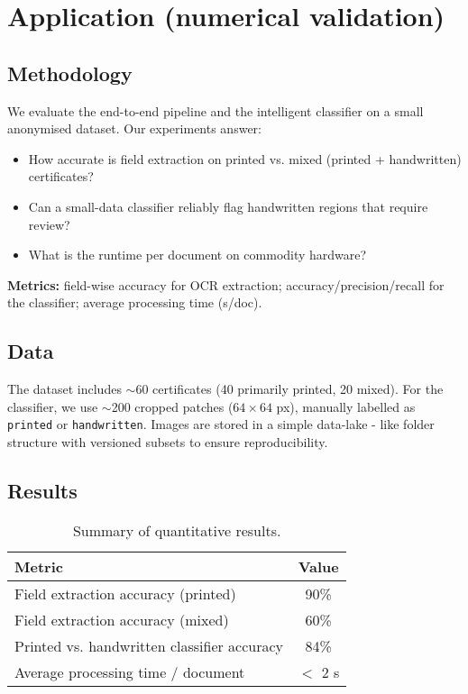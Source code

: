 \documentclass[runningheads,a4paper,11pt]{report}
\begin{document}
\chapter{Application (numerical validation)}
\label{chapter:application}

\section{Methodology}
We evaluate the end-to-end pipeline and the intelligent classifier on a small anonymised dataset.
Our experiments answer:
\begin{itemize}
  \item How accurate is field extraction on printed vs. mixed (printed + handwritten) certificates?
  \item Can a small-data classifier reliably flag handwritten regions that require review?
  \item What is the runtime per document on commodity hardware?
\end{itemize}
\noindent
\textbf{Metrics:} field-wise accuracy for OCR extraction; accuracy/precision/recall for the classifier; average processing time (s/doc).

\section{Data}
The dataset includes $\sim$60 certificates (40 primarily printed, 20 mixed).
For the classifier, we use $\sim$200 cropped patches ($64\times 64$ px), manually labelled as \texttt{printed} or \texttt{handwritten}.
Images are stored in a simple data-lake - like folder structure with versioned subsets to ensure reproducibility.

\section{Results}
\begin{table}[htbp]
\centering
\caption{Summary of quantitative results.}
\begin{tabular}{l c}
\hline
Metric & Value \\
\hline
Field extraction accuracy (printed) & 90\% \\
Field extraction accuracy (mixed) & 60\% \\
Printed vs. handwritten classifier accuracy & 84\% \\
Average processing time / document & $<$ 2 s \\
\hline
\end{tabular}
\end{table}
\end{document}
